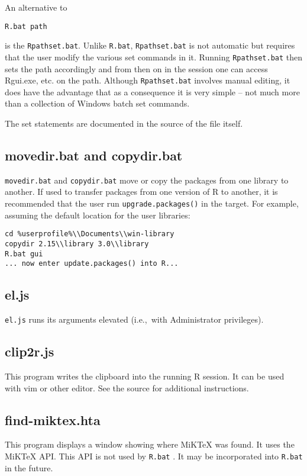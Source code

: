 An alternative to

\begin{verbatim}
R.bat path 
\end{verbatim}

is the \texttt{Rpathset.bat}. Unlike \texttt{R.bat},
\texttt{Rpathset.bat} is not automatic but requires that the user modify
the various set commands in it. Running \texttt{Rpathset.bat} then sets
the path accordingly and from then on in the session one can access
Rgui.exe, etc. on the path. Although \texttt{Rpathset.bat} involves
manual editing, it does have the advantage that as a consequence it is
very simple -- not much more than a collection of Windows batch set
commands.

The set statements are documented in the source of the file itself.

\subsection{movedir.bat and copydir.bat}

\texttt{movedir.bat} and \texttt{copydir.bat} move or copy the packages
from one library to another. If used to transfer packages from one
version of R to another, it is recommended that the user run
\texttt{upgrade.packages()} in the target. For example, assuming the
default location for the user libraries:

\begin{verbatim}
cd %userprofile%\\Documents\\win-library
copydir 2.15\\library 3.0\\library
R.bat gui 
... now enter update.packages() into R...
\end{verbatim}

\subsection{el.js}

\texttt{el.js} runs its arguments elevated (i.e.,~with Administrator
privileges).

\subsection{clip2r.js}

This program writes the clipboard into the running R session. It can be
used with vim or other editor. See the source for additional
instructions.

\subsection{find-miktex.hta}

This program displays a window showing where MiKTeX was found. It uses
the MiKTeX API. This API is not used by \texttt{R.bat} . It may be
incorporated into \texttt{R.bat} in the future.
